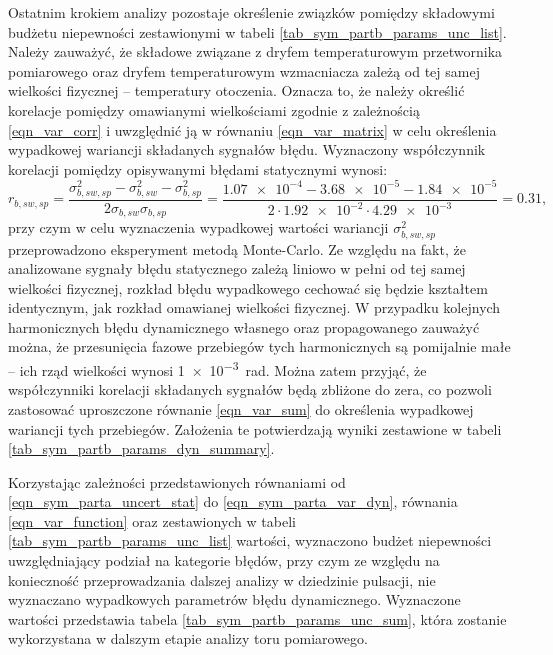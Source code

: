 Ostatnim krokiem analizy pozostaje określenie związków pomiędzy składowymi budżetu niepewności zestawionymi w tabeli \ref{tab_sym_partb_params_unc_list}. Należy zauważyć, że składowe związane z dryfem temperaturowym przetwornika pomiarowego oraz dryfem temperaturowym wzmacniacza zależą od tej samej wielkości fizycznej -- temperatury otoczenia. Oznacza to, że należy określić korelacje pomiędzy omawianymi wielkościami zgodnie z zależnością \eqref{eqn_var_corr} i uwzględnić ją w równaniu \eqref{eqn_var_matrix} w celu określenia wypadkowej wariancji składanych sygnałów błędu. Wyznaczony współczynnik korelacji pomiędzy opisywanymi błędami statycznymi wynosi:
\begin{equation}
r_{b,sw,sp} = \frac{\sigma_{b,sw,sp}^{2} - \sigma_{b,sw}^{2} - \sigma_{b,sp}^{2}}{2 \sigma_{b,sw} \sigma_{b,sp}} = \frac{\num{1.07e-4} - \num{3.68e-5} - \num{1.84e-5}}{2 \cdot \num{1.92e-2} \cdot \num{4.29e-3}} = 0.31 \label{eqn_sym_partb_stat_corr},
\end{equation}
przy czym w celu wyznaczenia wypadkowej wartości wariancji $\sigma_{b,sw,sp}^{2}$ przeprowadzono eksperyment metodą Monte-Carlo. Ze względu na fakt, że analizowane sygnały błędu statycznego zależą liniowo w pełni od tej samej wielkości fizycznej, rozkład błędu wypadkowego cechować się będzie kształtem identycznym, jak rozkład omawianej wielkości fizycznej. W przypadku kolejnych harmonicznych błędu dynamicznego własnego oraz propagowanego zauważyć można, że przesunięcia fazowe przebiegów tych harmonicznych są pomijalnie małe -- ich rząd wielkości wynosi \qty{1e-3}{rad}. Można zatem przyjąć, że współczynniki korelacji składanych sygnałów będą zbliżone do zera, co pozwoli zastosować uproszczone równanie \eqref{eqn_var_sum} do określenia wypadkowej wariancji tych przebiegów. Założenia te potwierdzają wyniki zestawione w tabeli \ref{tab_sym_partb_params_dyn_summary}.

Korzystając zależności przedstawionych równaniami od \eqref{eqn_sym_parta_uncert_stat} do \eqref{eqn_sym_parta_var_dyn}, równania \eqref{eqn_var_function} oraz zestawionych w tabeli \ref{tab_sym_partb_params_unc_list} wartości, wyznaczono budżet niepewności uwzględniający podział na kategorie błędów, przy czym ze względu na konieczność przeprowadzania dalszej analizy w dziedzinie pulsacji, nie wyznaczano wypadkowych parametrów błędu dynamicznego. Wyznaczone wartości przedstawia tabela \ref{tab_sym_partb_params_unc_sum}, która zostanie wykorzystana w dalszym etapie analizy toru pomiarowego.

